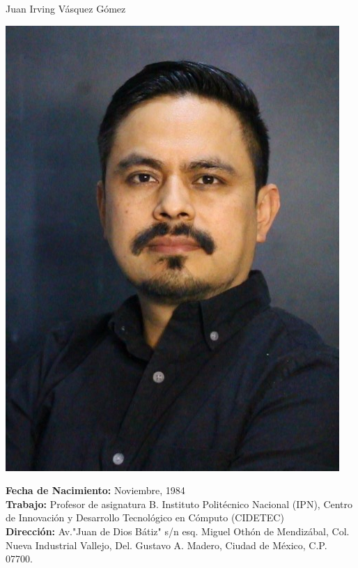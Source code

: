 \documentclass[10pt]{article}
\begin{document}
\begin{center}
{\huge Juan Irving Vásquez Gómez}
\vspace{0.5cm}


\begin{minipage}[b]{0.30\linewidth}
	\centering
	\includegraphics[width=\textwidth]{jivg36}
\end{minipage}
\hspace{0.5cm}
\begin{minipage}[b]{0.65\linewidth}
\textbf{Fecha de Nacimiento:} Noviembre, 1984 \\
\textbf{Trabajo:} Profesor de asignatura B. Instituto Politécnico Nacional (IPN), Centro de Innovación y Desarrollo Tecnológico en Cómputo (CIDETEC) \href{https://www.cidetec.ipn.mx/}{\faExternalLink} \\ 
\textbf{Dirección:} Av."Juan de Dios Bátiz" s/n esq. Miguel Othón de Mendizábal, 
Col. Nueva Industrial Vallejo, Del. Gustavo A. Madero, Ciudad de México, C.P. 07700. \\

\end{minipage}
\end{center}
\end{document}

